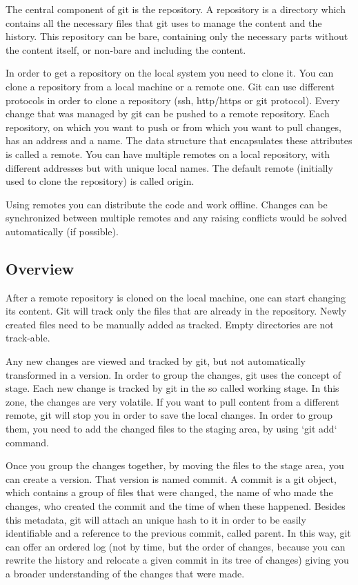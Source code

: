     The central component of git is the repository. A repository is a directory which contains all the necessary files that git uses to manage the content and the history. This repository can be bare, containing only the necessary parts without the content itself, or non-bare and including the content.
    
    In order to get a repository on the local system you need to clone it. You can clone a repository from a local machine or a remote one. Git can use different protocols in order to clone a repository (ssh, http/https or git protocol). Every change that was managed by git can be pushed to a remote repository. Each repository, on which you want to push or from which you want to pull changes, has an address and a name. The data structure that encapsulates these attributes is called a remote. You can have multiple remotes on a local repository, with different addresses but with unique local names. The default remote (initially used to clone the repository) is called origin.
    
    Using remotes you can distribute the code and work offline. Changes can be synchronized between multiple remotes and any raising conflicts would be solved automatically (if possible).
    
    \subsection{Overview}
        After a remote repository is cloned on the local machine, one can start changing its content. Git will track only the files that are already in the repository. Newly created files need to be manually added as tracked. Empty directories are not track-able.
        
        Any new changes are viewed and tracked by git, but not automatically transformed in a version. In order to group the changes, git uses the concept of stage. Each new change is tracked by git in the so called working stage. In this zone, the changes are very volatile. If you want to pull content from a different remote, git will stop you in order to save the local changes. In order to group them, you need to add the changed files to the staging area, by using `git add` command.
        
        Once you group the changes together, by moving the files to the stage area, you can create a version. That version is named commit. A commit is a git object, which contains a group of files that were changed, the name of who made the changes, who created the commit and the time of when these happened. Besides this metadata, git will attach an unique hash to it in order to be easily identifiable and a reference to the previous commit, called parent. In this way, git can offer an ordered log (not by time, but the order of changes, because you can rewrite the history and relocate a given commit in its tree of changes) giving you a broader understanding of the changes that were made.
        
